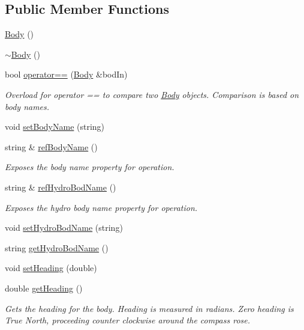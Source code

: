 \subsection*{Public Member Functions}
\begin{DoxyCompactItemize}
\item 
\hyperlink{class_body_a7727b0d8c998bbc2942e4c802e31e2eb}{Body} ()
\item 
\hyperlink{class_body_abe1c4da65568cf7978b6247affc461e3}{$\sim$\-Body} ()
\item 
bool \hyperlink{class_body_ad4580795d6db4b4ffd23db2a21ace9c7}{operator==} (\hyperlink{class_body}{Body} \&bod\-In)
\begin{DoxyCompactList}\small\item\em Overload for operator == to compare two \hyperlink{class_body}{Body} objects. Comparison is based on body names. \end{DoxyCompactList}\item 
void \hyperlink{class_body_a21190f9d796d631202db6caf768beae1}{set\-Body\-Name} (string)
\item 
string \& \hyperlink{class_body_ae1f5ffd42ba3b276a056eb56ec6ed5a9}{ref\-Body\-Name} ()
\begin{DoxyCompactList}\small\item\em Exposes the body name property for operation. \end{DoxyCompactList}\item 
string \& \hyperlink{class_body_aef09a9c9b037e1b4e42fbdd1fa61c65d}{ref\-Hydro\-Bod\-Name} ()
\begin{DoxyCompactList}\small\item\em Exposes the hydro body name property for operation. \end{DoxyCompactList}\item 
void \hyperlink{class_body_a423511decfb427835d6734e1c21e1856}{set\-Hydro\-Bod\-Name} (string)
\item 
string \hyperlink{class_body_ada5245142768e7b4cdc74504651438bb}{get\-Hydro\-Bod\-Name} ()
\item 
void \hyperlink{class_body_a7bba55a8fd4aea7a17ce7bd5f54d6ab8}{set\-Heading} (double)
\item 
double \hyperlink{class_body_ac34e65deb4894bd5c2b5d4089be0dcb0}{get\-Heading} ()
\begin{DoxyCompactList}\small\item\em Gets the heading for the body. Heading is measured in radians. Zero heading is True North, proceeding counter clockwise around the compass rose. \end{DoxyCompactList}\item 

\end{DoxyCompactItemize}
